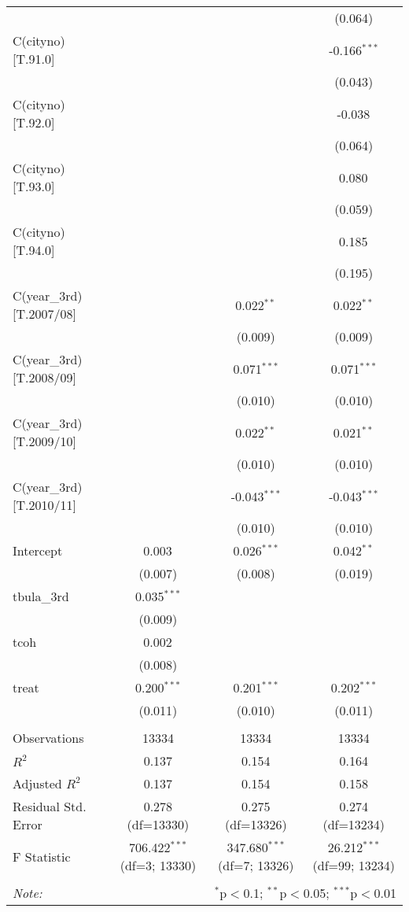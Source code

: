 \begin{table}[!htbp]
\begin{tabular}{@{\extracolsep{5pt}}lccc}
& & & (0.064) \\
 C(cityno)[T.91.0] & & & -0.166$^{***}$ \\
& & & (0.043) \\
 C(cityno)[T.92.0] & & & -0.038$^{}$ \\
& & & (0.064) \\
 C(cityno)[T.93.0] & & & 0.080$^{}$ \\
& & & (0.059) \\
 C(cityno)[T.94.0] & & & 0.185$^{}$ \\
& & & (0.195) \\
 C(year_3rd)[T.2007/08] & & 0.022$^{**}$ & 0.022$^{**}$ \\
& & (0.009) & (0.009) \\
 C(year_3rd)[T.2008/09] & & 0.071$^{***}$ & 0.071$^{***}$ \\
& & (0.010) & (0.010) \\
 C(year_3rd)[T.2009/10] & & 0.022$^{**}$ & 0.021$^{**}$ \\
& & (0.010) & (0.010) \\
 C(year_3rd)[T.2010/11] & & -0.043$^{***}$ & -0.043$^{***}$ \\
& & (0.010) & (0.010) \\
 Intercept & 0.003$^{}$ & 0.026$^{***}$ & 0.042$^{**}$ \\
& (0.007) & (0.008) & (0.019) \\
 tbula_3rd & 0.035$^{***}$ & & \\
& (0.009) & & \\
 tcoh & 0.002$^{}$ & & \\
& (0.008) & & \\
 treat & 0.200$^{***}$ & 0.201$^{***}$ & 0.202$^{***}$ \\
& (0.011) & (0.010) & (0.011) \\
\hline \\[-1.8ex]
 Observations & 13334 & 13334 & 13334 \\
 $R^2$ & 0.137 & 0.154 & 0.164 \\
 Adjusted $R^2$ & 0.137 & 0.154 & 0.158 \\
 Residual Std. Error & 0.278 (df=13330) & 0.275 (df=13326) & 0.274 (df=13234) \\
 F Statistic & 706.422$^{***}$ (df=3; 13330) & 347.680$^{***}$ (df=7; 13326) & 26.212$^{***}$ (df=99; 13234) \\
\hline
\hline \\[-1.8ex]
\textit{Note:} & \multicolumn{3}{r}{$^{*}$p$<$0.1; $^{**}$p$<$0.05; $^{***}$p$<$0.01} \\
\end{tabular}
\end{table}

